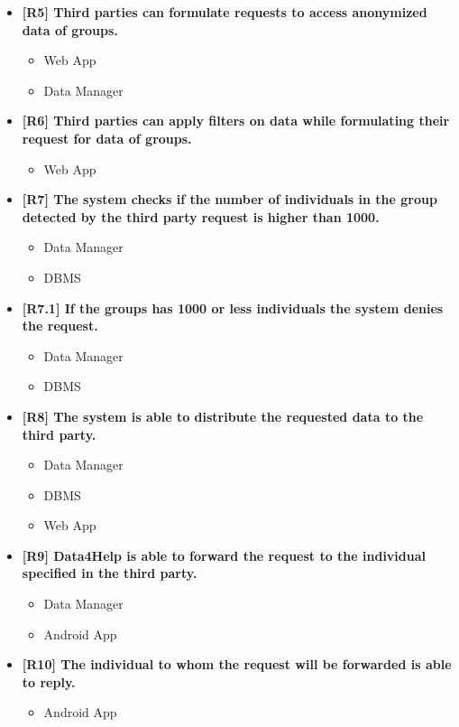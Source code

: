 \begin{itemize}
\item \textbf{[R5] Third parties can formulate requests to access anonymized data of groups.}
\begin{itemize}
\item Web App
\item Data Manager
\end{itemize}

\item \textbf{[R6] Third parties can apply filters on data while formulating their request for data of groups.}
\begin{itemize}
\item Web App
\end{itemize}


\item \textbf{[R7] The system checks if the number of individuals in the group detected by the third party request is higher than 1000.}
\begin{itemize}
\item Data Manager
\item DBMS
\end{itemize}


\item \textbf{[R7.1] If the groups has 1000 or less individuals the system denies the request.}
\begin{itemize}
\item Data Manager
\item DBMS
\end{itemize}


\item \textbf{[R8] The system is able to distribute the requested data to the third party.}
\begin{itemize}
\item Data Manager
\item DBMS
\item Web App
\end{itemize}

\item \textbf{[R9] Data4Help is able to forward the request to the individual specified in the third party.}
\begin{itemize}
\item Data Manager
\item Android App
\end{itemize}

\item \textbf{[R10] The individual to whom the request will be forwarded is able to reply.}
\begin{itemize}
\item Android App
\end{itemize}



\end{itemize}
